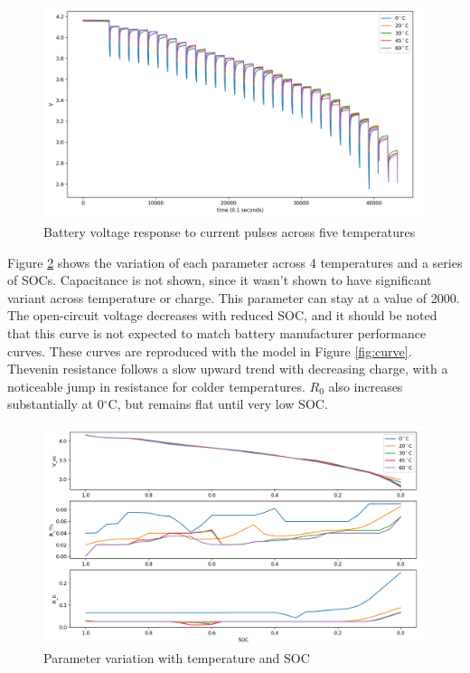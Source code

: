 \documentclass[]{aiaa-tc}%
\begin{document}
\begin{figure}[!htb]
	\centering
	\includegraphics[width=1.0\textwidth]{figures/All_Temp.png}
	\caption{Battery voltage response to current pulses across five temperatures}
	\label{fig:AllTemp}
\end{figure}



Figure \ref{fig:Map} shows the variation of each parameter across 4 temperatures and a series of SOCs. Capacitance is not shown, since it wasn't shown to have significant variant across temperature or charge. This parameter can stay at a value of 2000. The open-circuit voltage decreases with reduced SOC, and it should be noted that this curve is not expected to match battery manufacturer performance curves. These curves are reproduced with the model in Figure \ref{fig:curve}. Thevenin resistance follows a slow upward trend with decreasing charge, with a noticeable jump in resistance for colder temperatures. $R_0$ also increases substantially at 0$^\circ$C, but remains flat until very low SOC.

\begin{figure}[!htb]
	\centering
	\includegraphics[width=1.0\textwidth]{figures/maps.png}
	\caption{Parameter variation with temperature and SOC}
	\label{fig:Map}
\end{figure}
\end{document}

